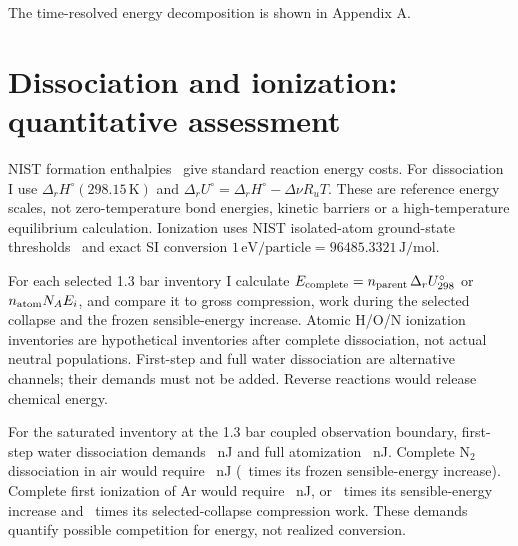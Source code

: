 \documentclass[10pt,a4paper]{article}
\begin{document}
\begin{table}[H]\centering\small
\caption{Saturated-inventory energy at the refined observed thermal peak. $W_{\rm by}$ is work done by the gas; heat loss is signed. $\epsilon_E$ is the maximum residual over the observed interval, normalized by the largest sensible-energy, work, heat or initial $nR_uT_0$ scale.}

\end{table}
The time-resolved energy decomposition is shown in Appendix A.

\newpage
\section{Dissociation and ionization: quantitative assessment}
NIST formation enthalpies~\cite{nist} give standard reaction energy costs. For dissociation I use $\Delta_rH^\circ(298.15\,\mathrm K)$ and $\Delta_rU^\circ=\Delta_rH^\circ-\Delta\nu R_uT$. These are reference energy scales, not zero-temperature bond energies, kinetic barriers or a high-temperature equilibrium calculation. Ionization uses NIST isolated-atom ground-state thresholds~\cite{atomic} and exact SI conversion $1\,\mathrm{eV/particle}=96485.3321\,\mathrm{J/mol}$.
\begin{table}[H]\centering\small
\caption{Energy scales. Dissociation ``Energy'' denotes $\Delta_rH^\circ_{298}$ in eV per parent molecule; ``Cost'' is $\Delta_rU^\circ_{298}$. Ionization entries use the ground-state threshold in both columns. The $E/R_u$ scale is not an onset temperature.}

\end{table}

For each selected 1.3 bar inventory I calculate $E_{\rm complete}=n_{\rm parent}\,\Delta_rU^\circ_{298}$ or $n_{\rm atom}N_AE_i$, and compare it to gross compression, work during the selected collapse and the frozen sensible-energy increase. Atomic H/O/N ionization inventories are hypothetical inventories after complete dissociation, not actual neutral populations. First-step and full water dissociation are alternative channels; their demands must not be added. Reverse reactions would release chemical energy.

For the saturated inventory at the 1.3 bar coupled observation boundary, first-step water dissociation demands \ChemWaterFirstNJ\ nJ and full atomization \ChemWaterFullNJ\ nJ. Complete N$_2$ dissociation in air would require \ChemAirNtwoNJ\ nJ (\ChemAirNtwoToU\ times its frozen sensible-energy increase). Complete first ionization of Ar would require \ChemArgonIonNJ\ nJ, or \ChemArgonIonToU\ times its sensible-energy increase and \ChemArgonIonToWork\ times its selected-collapse compression work. These demands quantify possible competition for energy, not realized conversion.
\end{document}
